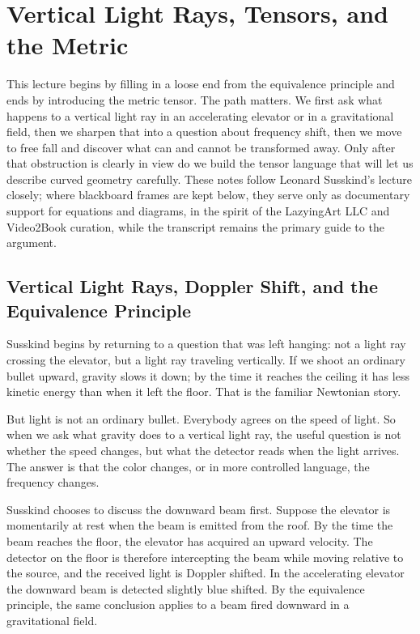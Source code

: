\chapter{Vertical Light Rays, Tensors, and the Metric}

This lecture begins by filling in a loose end from the equivalence principle and ends by introducing the metric tensor. The path matters. We first ask what happens to a vertical light ray in an accelerating elevator or in a gravitational field, then we sharpen that into a question about frequency shift, then we move to free fall and discover what can and cannot be transformed away. Only after that obstruction is clearly in view do we build the tensor language that will let us describe curved geometry carefully. These notes follow Leonard Susskind's lecture closely; where blackboard frames are kept below, they serve only as documentary support for equations and diagrams, in the spirit of the LazyingArt LLC and Video2Book curation, while the transcript remains the primary guide to the argument.

\section{Vertical Light Rays, Doppler Shift, and the Equivalence Principle}

Susskind begins by returning to a question that was left hanging: not a light ray crossing the elevator, but a light ray traveling vertically. If we shoot an ordinary bullet upward, gravity slows it down; by the time it reaches the ceiling it has less kinetic energy than when it left the floor. That is the familiar Newtonian story.

But light is not an ordinary bullet. Everybody agrees on the speed of light. So when we ask what gravity does to a vertical light ray, the useful question is not whether the speed changes, but what the detector reads when the light arrives. The answer is that the color changes, or in more controlled language, the frequency changes.

Susskind chooses to discuss the downward beam first. Suppose the elevator is momentarily at rest when the beam is emitted from the roof. By the time the beam reaches the floor, the elevator has acquired an upward velocity. The detector on the floor is therefore intercepting the beam while moving relative to the source, and the received light is Doppler shifted. In the accelerating elevator the downward beam is detected slightly blue shifted. By the equivalence principle, the same conclusion applies to a beam fired downward in a gravitational field.

